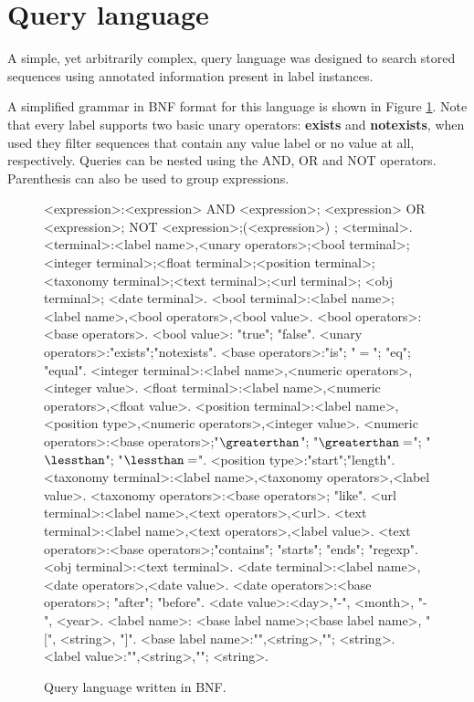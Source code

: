 \section{Query language}\label{sec:grammar}

A simple, yet arbitrarily complex, query language was designed to search
stored sequences using annotated information present in label instances.

A simplified grammar in BNF format for this language is shown in Figure \ref{fig:query_bnf}.
Note that every label supports two basic unary operators: \textbf{exists} and \textbf{notexists}, when
used they filter sequences that contain any value label or no value at all, respectively.
Queries can be nested using the AND, OR and NOT operators. Parenthesis can also be used to group expressions.

\begin{figure}[ht]
\begin{grammar} 
<expression>:<expression> AND <expression>; <expression> OR <expression>; NOT <expression>;(<expression>) ; <terminal>.
<terminal>:<label name>,<unary operators>;<bool terminal>;<integer terminal>;<float terminal>;<position terminal>;<taxonomy terminal>;<text terminal>;<url terminal>; <obj terminal>; <date terminal>.
<bool terminal>:<label name>;<label name>,<bool operators>,<bool value>.
<bool operators>:<base operators>.
<bool value>: "true"; "false".
<unary operators>:"exists";"notexists".
<base operators>:"is"; "$=$"; "eq"; "equal".
<integer terminal>:<label name>,<numeric operators>,<integer value>.
<float terminal>:<label name>,<numeric operators>,<float value>.
<position terminal>:<label name>,<position type>,<numeric operators>,<integer value>.
<numeric operators>:<base operators>;"$\greaterthan$"; "$\greaterthan=$"; "$\lessthan$"; "$\lessthan=$".
<position type>:"start";"length".
<taxonomy terminal>:<label name>,<taxonomy operators>,<label value>.
<taxonomy operators>:<base operators>; "like".
<url terminal>:<label name>,<text operators>,<url>.
<text terminal>:<label name>,<text operators>,<label value>.
<text operators>:<base operators>;"contains"; "starts"; "ends"; "regexp".
<obj terminal>:<text terminal>.
<date terminal>:<label name>,<date operators>,<date value>.
<date operators>:<base operators>; "after"; "before".
<date value>:<day>,"-", <month>, "-", <year>.
<label name>: <base label name>;<base label name>, "[", <string>, "]".
<base label name>:"{\tt\quotesymbol}",<string>,"{\tt\quotesymbol}"; <string>.
<label value>:"{\tt\quotesymbol}",<string>,"{\tt\quotesymbol}"; <string>.
\end{grammar}
\caption{Query language written in BNF.}
\label{fig:query_bnf}
\end{figure}

